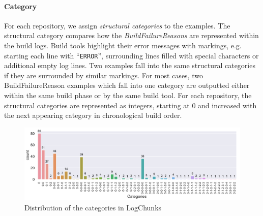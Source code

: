 \documentclass[\myrootdir/main.tex]{subfiles}
\begin{document}
\paragraph{Category}
For each repository, we assign \emph{structural categories} to the examples.
The structural category compares how the \emph{BuildFailureReasons} are represented within the build logs.
Build tools highlight their error messages with markings, e.g. starting each line with ``\texttt{ERROR}'', surrounding lines filled with special characters or additional empty log lines.
Two examples fall into the same structural categories if they are surrounded by similar markings.
For most cases, two BuildFailureReason examples which fall into one category are outputted either within the same build phase or by the same build tool.
For each repository, the structural categories are represented as integers, starting at 0 and increased with the next appearing category in chronological build order.

\begin{figure}[htbp]
	\centering
	\includegraphics[width=\textwidth, clip]{img/big-study/categories-dataset.pdf}
	\caption{Distribution of the categories in LogChunks}
	\label{fig:categorycount-examplecount-dataset}
\end{figure}

\end{document}
